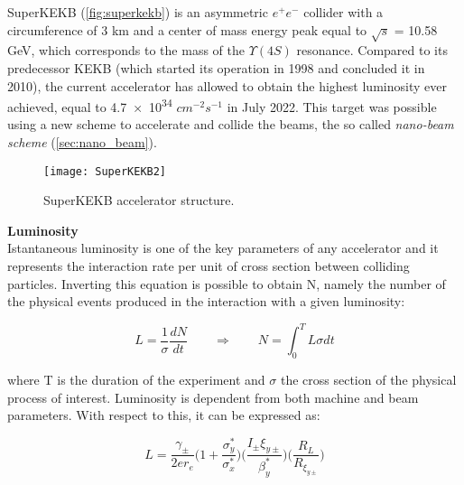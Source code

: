 SuperKEKB (\autoref{fig:superkekb}) is an asymmetric $e^{+}e^{-}$ collider with a circumference of 3 km and a center of mass energy peak equal to  $\sqrt{s}$ = 10.58 GeV, which corresponds to the mass of the $\Upsilon(4S)$ resonance.
Compared to its predecessor KEKB (which started its operation in 1998 and concluded it in 2010), the current accelerator has allowed to obtain the highest luminosity ever achieved, equal to \num{4.7e34} $cm^{-2}s^{-1}$ in July 2022. This target was possible using a new scheme to accelerate and collide the beams, the so called \textit{nano-beam scheme} (\autoref{sec:nano_beam}). 

\begin{comment}
Furthermore a new upgrade of the machine, still under study, will also include other interventions expecially to cope with higher background levels, in view of a future increase in luminosity.
\end{comment}

\begin{figure}[h!]
\centering
\texttt{[image: SuperKEKB2]}
\caption{SuperKEKB accelerator structure.}
\label{fig:superkekb}
\end{figure}


\bigskip

\textbf{Luminosity}\\

Istantaneous luminosity is one of the key parameters of any accelerator and it represents the interaction rate per unit of cross section between colliding particles. Inverting this equation is possible to obtain N, namely the number of the physical events produced in the interaction with a given luminosity:

\begin{equation}
L =\frac{1}{\sigma}\frac{dN}{dt}  \qquad   \Rightarrow \qquad  N = \int_{0}^{T} L\sigma dt
\end{equation}

where T is the duration of the experiment and $\sigma$ the cross section of the physical process of interest. Luminosity is dependent from both machine and beam parameters. With respect to this, it can be expressed as:

\begin{equation} \label{eq:luminosity_eq}
L = \frac{\gamma_{\pm}}{2er_{e}} \bigg(1 + \frac{\sigma_{y}^{*}}{\sigma_{x}^{*}} \bigg) \bigg(\frac{I_{\pm}\xi_{y\pm}}{\beta^{*}_{y}} \bigg) \bigg(\frac{R_{L}}{R_{\xi_{y\pm}}} \bigg)
\end{equation}

